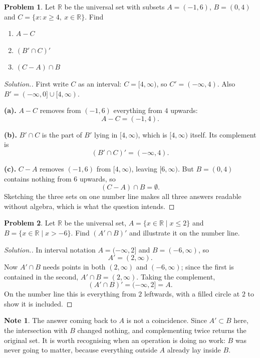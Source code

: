 \documentclass[11pt,a4paper]{article}
\theoremstyle{definition}
\newtheorem{note}[thm]{Note}
\newtheorem{problemx}{Problem}[section]
\newenvironment{problem}{\begin{problemx}}{\end{problemx}}
\newenvironment{solution}
  {\renewcommand{\qedsymbol}{}\begin{proof}[\textit{Solution}.]}
  {\end{proof}}
\begin{document}
\begin{problem}
Let $\mathbb{R}$ be the universal set with subsets $A=(-1,6)$, $B=(0,4)$ and
$C=\{x: x\geq 4,\ x\in\mathbb{R}\}$. Find
\begin{enumerate}
\item[(a).] $A-C$
\item[(b).] $\left(B'\cap C\right)'$
\item[(c).] $(C-A)\cap B$
\end{enumerate}
\end{problem}

\begin{solution}
First write $C$ as an interval: $C=[4,\infty)$, so $C'=(-\infty,4)$. Also
$B'=(-\infty,0]\cup[4,\infty)$.

\textbf{(a).} $A-C$ removes from $(-1,6)$ everything from $4$ upwards:
$$A-C=(-1,4).$$

\textbf{(b).} $B'\cap C$ is the part of $B'$ lying in $[4,\infty)$, which is
$[4,\infty)$ itself. Its complement is
$$\left(B'\cap C\right)'=(-\infty,4).$$

\textbf{(c).} $C-A$ removes $(-1,6)$ from $[4,\infty)$, leaving $[6,\infty)$. But
$B=(0,4)$ contains nothing from $6$ upwards, so
$$(C-A)\cap B=\emptyset .$$
Sketching the three sets on one number line makes all three answers readable
without algebra, which is what the question intends.
\end{solution}

\begin{problem}
Let $\mathbb{R}$ be the universal set, $A=\{x\in\mathbb{R}\mid x\leq 2\}$ and
$B=\{x\in\mathbb{R}\mid x>-6\}$. Find $\left(A'\cap B\right)'$ and illustrate it on
the number line.
\end{problem}

\begin{solution}
In interval notation $A=(-\infty,2]$ and $B=(-6,\infty)$, so
$$A'=(2,\infty).$$
Now $A'\cap B$ needs points in both $(2,\infty)$ and $(-6,\infty)$; since the first
is contained in the second, $A'\cap B=(2,\infty)$. Taking the complement,
$$\left(A'\cap B\right)'=(-\infty,2]=A .$$
On the number line this is everything from $2$ leftwards, with a filled circle at
$2$ to show it is included.
\end{solution}

\begin{note}
The answer coming back to $A$ is not a coincidence. Since $A'\subset B$ here, the
intersection with $B$ changed nothing, and complementing twice returns the original
set. It is worth recognising when an operation is doing no work: $B$ was never
going to matter, because everything outside $A$ already lay inside $B$.
\end{note}
\end{document}
